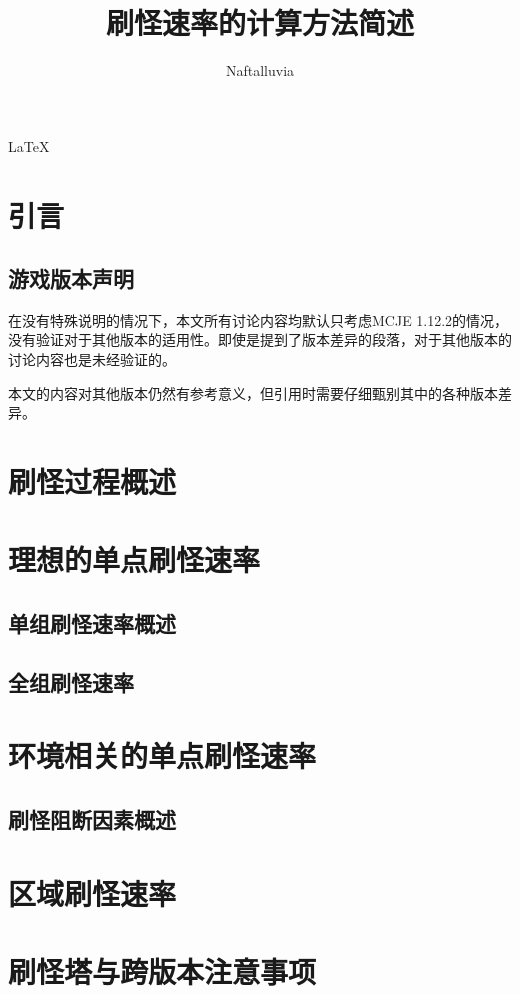 \documentclass[a4paper, UTF8, twoside]{ctexart}
\title{刷怪速率的计算方法简述}
\author{Naftalluvia}
\begin{document}
\maketitle

\begin{center}
    \LaTeX
\end{center}

\section{引言}

\subsection{游戏版本声明}

在没有特殊说明的情况下，本文所有讨论内容均默认只考虑MCJE 1.12.2的情况，没有验证对于其他版本的适用性。即使是提到了版本差异的段落，对于其他版本的讨论内容也是未经验证的。

本文的内容对其他版本仍然有参考意义，但引用时需要仔细甄别其中的各种版本差异。

\section{刷怪过程概述}

\section{理想的单点刷怪速率}

\subsection{单组刷怪速率概述}

\subsection{全组刷怪速率}

\section{环境相关的单点刷怪速率}

\subsection{刷怪阻断因素概述}

\section{区域刷怪速率}

\section{刷怪塔与跨版本注意事项}
\end{document}
